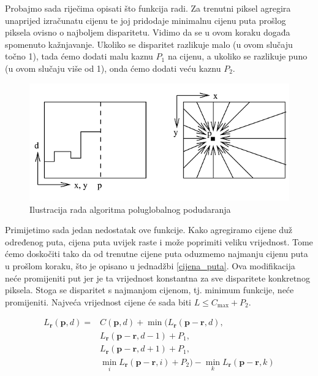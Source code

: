 \documentclass[utf8, zavrsni, numeric]{fer}
\begin{document}
Probajmo sada riječima opisati što funkcija radi. Za trenutni piksel agregira unaprijed izračunatu cijenu te joj pridodaje minimalnu cijenu puta prošlog piksela ovisno o najboljem disparitetu. Vidimo da se u ovom koraku događa spomenuto kažnjavanje.
Ukoliko se disparitet razlikuje malo (u ovom slučaju točno 1), tada ćemo dodati malu kaznu $P_1$ na cijenu, a ukoliko
se razlikuje puno (u ovom slučaju više od 1), onda ćemo dodati veću kaznu $P_2$.

\begin{figure}[H]
  \centering
  \includegraphics[width=12cm]{img/sgm.png}
  \caption{Ilustracija rada algoritma poluglobalnog podudaranja}
  \label{fig:SGM}
\end{figure}


Primijetimo sada jedan nedostatak ove funkcije. Kako agregiramo cijene duž određenog puta, cijena puta uvijek raste i može poprimiti veliku vrijednost. Tome ćemo doskočiti tako da od trenutne cijene puta oduzmemo najmanju cijenu puta u prošlom koraku, što je opisano u jednadžbi \ref{cijena_puta}.
Ova modifikacija neće promijeniti put jer je ta vrijednost konstantna za sve disparitete konkretnog piksela. Stoga se disparitet s najmanjom cijenom, tj. minimum funkcije, neće promijeniti.
Najveća vrijednost cijene će sada biti $L \leq C_{\max} + P_2$.

\begin{equation} \label{cijena_puta}
  \begin{split}
    L_{\mathbf{r}}(\mathbf{p}, d) = & C(\mathbf{p}, d) + \min(L_{\mathbf{r}}(\mathbf{p} - \mathbf{r}, d), \\
    & L_{\mathbf{r}}(\mathbf{p} - \mathbf{r}, d - 1) + P_1, \\
    & L_{\mathbf{r}}(\mathbf{p} - \mathbf{r}, d + 1) + P_1, \\
    & \min\limits_{i} L_{\mathbf{r}}(\mathbf{p} - \mathbf{r}, i) + P_2) - \min\limits_{k}L_{\mathbf{r}}(\mathbf{p} - \mathbf{r}, k) \\
  \end{split}
\end{equation}
\end{document}
